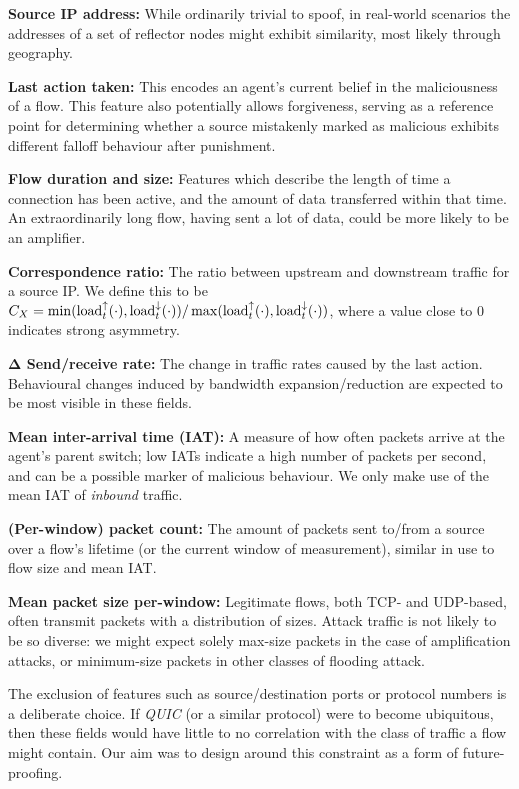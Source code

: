 \documentclass[conference, letterpaper, 10pt, times]{IEEEtran}
\newcommand{\fakepara}[1]{\noindent\textbf{#1:}}
\begin{document}
\fakepara{Source IP address}
While ordinarily trivial to spoof, in real-world scenarios the addresses of a set of reflector nodes might exhibit similarity, most likely through geography.

\fakepara{Last action taken}
This encodes an agent's current belief in the maliciousness of a flow.
This feature also potentially allows forgiveness, serving as a reference point for determining whether a source mistakenly marked as malicious exhibits different falloff behaviour after punishment.

\fakepara{Flow duration and size}
Features which describe the length of time a connection has been active, and the amount of data transferred within that time.
An extraordinarily long flow, having sent a lot of data, could be more likely to be an amplifier.

\fakepara{Correspondence ratio}
The ratio between upstream and downstream traffic for a source IP.
We define this to be $C_X = \min(\operatorname{load}^{\uparrow}_{t}(\cdot), \operatorname{load}^{\downarrow}_{t}(\cdot))/\max(\operatorname{load}^{\uparrow}_{t}(\cdot), \operatorname{load}^{\downarrow}_{t}(\cdot))$, where a value close to 0 indicates strong asymmetry.

\fakepara{$\mathbf{\Delta}$ Send/receive rate}
The change in traffic rates caused by the last action.
Behavioural changes induced by bandwidth expansion/reduction are expected to be most visible in these fields.

\fakepara{Mean inter-arrival time (IAT)}
A measure of how often packets arrive at the agent's parent switch; low IATs indicate a high number of packets per second, and can be a possible marker of malicious behaviour.
We only make use of the mean IAT of \emph{inbound} traffic.

\fakepara{(Per-window) packet count}
The amount of packets sent to/from a source over a flow's lifetime (or the current window of measurement), similar in use to flow size and mean IAT.

\fakepara{Mean packet size per-window}
Legitimate flows, both TCP- and UDP-based, often transmit packets with a distribution of sizes.
Attack traffic is not likely to be so diverse: we might expect solely max-size packets in the case of amplification attacks, or minimum-size packets in other classes of flooding attack.

The exclusion of features such as source/destination ports or protocol numbers is a deliberate choice.
If \emph{QUIC} (or a similar protocol) were to become ubiquitous, then these fields would have little to no correlation with the class of traffic a flow might contain.
Our aim was to design around this constraint as a form of future-proofing.
\end{document}
